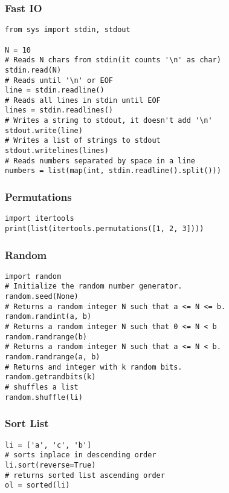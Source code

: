 \documentclass[twoside]{article}
\begin{document}
\begin{multicols*}{2}
\subsubsectionfont{\large\bfseries\sffamily\underline}
\subsubsection*{Fast IO}
\begin{verbatim}
from sys import stdin, stdout

N = 10
# Reads N chars from stdin(it counts '\n' as char)
stdin.read(N)
# Reads until '\n' or EOF
line = stdin.readline()
# Reads all lines in stdin until EOF
lines = stdin.readlines()
# Writes a string to stdout, it doesn't add '\n'
stdout.write(line)
# Writes a list of strings to stdout
stdout.writelines(lines)
# Reads numbers separated by space in a line
numbers = list(map(int, stdin.readline().split()))

\end{verbatim}

\subsubsectionfont{\large\bfseries\sffamily\underline}
\subsubsection*{Permutations}
\begin{verbatim}
import itertools
print(list(itertools.permutations([1, 2, 3])))

\end{verbatim}

\subsubsectionfont{\large\bfseries\sffamily\underline}
\subsubsection*{Random}
\begin{verbatim}
import random
# Initialize the random number generator.
random.seed(None)
# Returns a random integer N such that a <= N <= b.
random.randint(a, b)
# Returns a random integer N such that 0 <= N < b
random.randrange(b)
# Returns a random integer N such that a <= N < b.
random.randrange(a, b)
# Returns and integer with k random bits.
random.getrandbits(k)
# shuffles a list
random.shuffle(li)
\end{verbatim}

\subsubsectionfont{\large\bfseries\sffamily\underline}
\subsubsection*{Sort List}
\begin{verbatim}
li = ['a', 'c', 'b']
# sorts inplace in descending order
li.sort(reverse=True)
# returns sorted list ascending order
ol = sorted(li)
\end{verbatim}


\end{multicols*}
\end{document}
